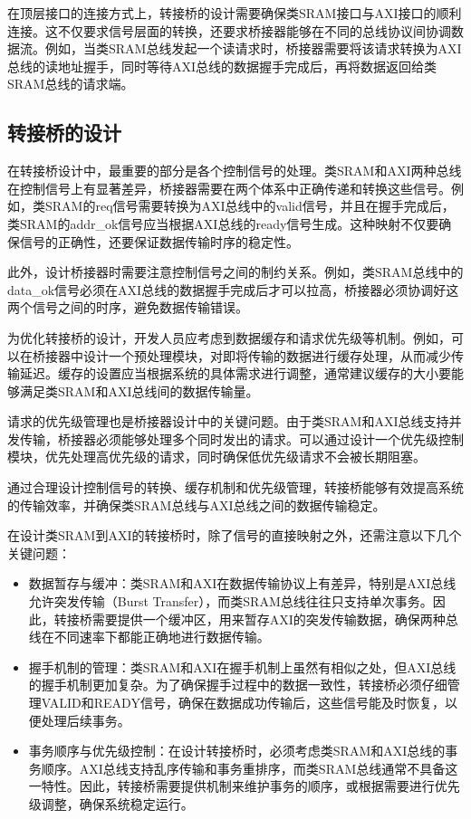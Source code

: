 在顶层接口的连接方式上，转接桥的设计需要确保类SRAM接口与AXI接口的顺利连接。这不仅要求信号层面的转换，还要求桥接器能够在不同的总线协议间协调数据流。例如，当类SRAM总线发起一个读请求时，桥接器需要将该请求转换为AXI总线的读地址握手，同时等待AXI总线的数据握手完成后，再将数据返回给类SRAM总线的请求端。

\subsection{转接桥的设计}\label{sec:08-bus-and-soc-028}

在转接桥设计中，最重要的部分是各个控制信号的处理。类SRAM和AXI两种总线在控制信号上有显著差异，桥接器需要在两个体系中正确传递和转换这些信号。例如，类SRAM的req信号需要转换为AXI总线中的valid信号，并且在握手完成后，类SRAM的addr\_ok信号应当根据AXI总线的ready信号生成。这种映射不仅要确保信号的正确性，还要保证数据传输时序的稳定性。

此外，设计桥接器时需要注意控制信号之间的制约关系。例如，类SRAM总线中的data\_ok信号必须在AXI总线的数据握手完成后才可以拉高，桥接器必须协调好这两个信号之间的时序，避免数据传输错误。

为优化转接桥的设计，开发人员应考虑到数据缓存和请求优先级等机制。例如，可以在桥接器中设计一个预处理模块，对即将传输的数据进行缓存处理，从而减少传输延迟。缓存的设置应当根据系统的具体需求进行调整，通常建议缓存的大小要能够满足类SRAM和AXI总线间的数据传输量。

请求的优先级管理也是桥接器设计中的关键问题。由于类SRAM和AXI总线支持并发传输，桥接器必须能够处理多个同时发出的请求。可以通过设计一个优先级控制模块，优先处理高优先级的请求，同时确保低优先级请求不会被长期阻塞。

通过合理设计控制信号的转换、缓存机制和优先级管理，转接桥能够有效提高系统的传输效率，并确保类SRAM总线与AXI总线之间的数据传输稳定。

在设计类SRAM到AXI的转接桥时，除了信号的直接映射之外，还需注意以下几个关键问题：

\begin{itemize}
\tightlist
\item
  数据暂存与缓冲：类SRAM和AXI在数据传输协议上有差异，特别是AXI总线允许突发传输（Burst Transfer），而类SRAM总线往往只支持单次事务。因此，转接桥需要提供一个缓冲区，用来暂存AXI的突发传输数据，确保两种总线在不同速率下都能正确地进行数据传输。
\item
  握手机制的管理：类SRAM和AXI在握手机制上虽然有相似之处，但AXI总线的握手机制更加复杂。为了确保握手过程中的数据一致性，转接桥必须仔细管理VALID和READY信号，确保在数据成功传输后，这些信号能及时恢复，以便处理后续事务。
\item
  事务顺序与优先级控制：在设计转接桥时，必须考虑类SRAM和AXI总线的事务顺序。AXI总线支持乱序传输和事务重排序，而类SRAM总线通常不具备这一特性。因此，转接桥需要提供机制来维护事务的顺序，或根据需要进行优先级调整，确保系统稳定运行。
\end{itemize}

